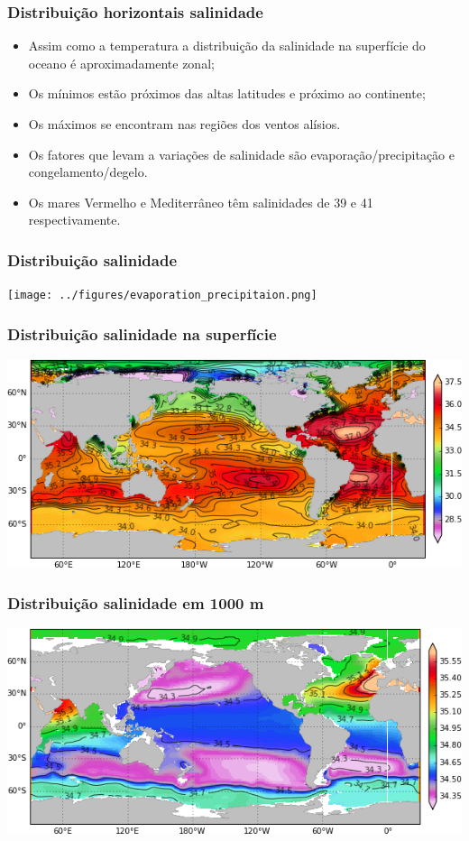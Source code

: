 \begin{frame}
  \frametitle{Distribuição horizontais salinidade}
  \small{
  \begin{itemize}[<+-| alert@+>]
    \item Assim como a temperatura a distribuição da salinidade na superfície
          do oceano é aproximadamente zonal;
    \item Os mínimos estão próximos das altas latitudes e próximo ao
          continente;
    \item Os máximos se encontram nas regiões dos ventos alísios.
    \item Os fatores que levam a variações de salinidade são
          evaporação/precipitação e congelamento/degelo.
    \item Os mares Vermelho e Mediterrâneo têm salinidades de 39 e 41
          respectivamente.
  \end{itemize}
  }
\end{frame}


\begin{frame}
\frametitle{Distribuição salinidade}
  \begin{center}
    \texttt{[image: ../figures/evaporation\_precipitaion.png]}
  \end{center}
\end{frame}


\begin{frame}
\frametitle{Distribuição salinidade na superfície}
  \begin{center}
    \includegraphics[scale=0.6]{./figures/woa09_salinity_0_annual.png}
  \end{center}
\end{frame}


\begin{frame}
\frametitle{Distribuição salinidade em 1000 m}
  \begin{center}
    \includegraphics[scale=0.6]{./figures/woa09_salinity_1000_annual.png}
  \end{center}
\end{frame}


